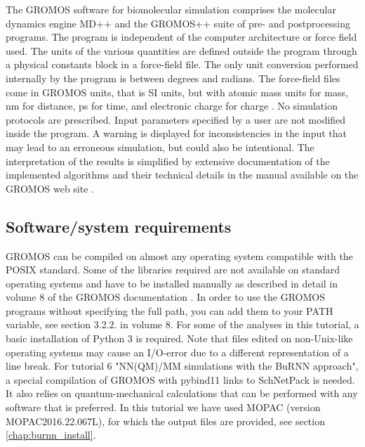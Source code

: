 The GROMOS software for biomolecular simulation comprises the molecular dynamics engine MD++ and the \linebreak GROMOS++ suite of pre- and postprocessing programs. The program is independent of the computer architecture or force field used. 
The units of the various quantities are defined outside the program through a physical constants block in a force-field file. The only unit conversion performed internally by the program is between degrees and radians. The force-field files come 
in GROMOS units, that is SI units, but with atomic mass units for mass, nm for distance, ps for time, and electronic charge for charge \cite{volume_6}. No simulation protocols are prescribed. 
Input parameters specified by a user are not modified inside 
the program. %
A warning is displayed for inconsistencies in the input that may lead to an erroneous simulation, but could also be intentional.
The interpretation of the results is simplified by extensive 
documentation of the implemented algorithms and their technical details 
in the manual available on the GROMOS web site \cite{volume_6,volume_2}.

\subsection{Software/system requirements}
%
GROMOS can be compiled on almost any operating system compatible with the POSIX standard.
 Some of the libraries required are not available on standard operating systems and have to be installed 
manually as described in detail in volume 8 of the GROMOS documentation \cite{volume_8}. 
In order to use the GROMOS programs without specifying the full path, you can add them to your PATH variable, see section 3.2.2. in volume 8.
For some of the analyses in this tutorial, a basic installation of Python 3 is required. 
Note that files edited on non-Unix-like operating systems may cause an I/O-error due to a different representation of a line break. For tutorial 6 "NN(QM)/MM simulations with the BuRNN approach", a special compilation of GROMOS with pybind11 links to SchNetPack is needed. It also relies on quantum-mechanical calculations that can be performed with any software that is preferred. In this tutorial we have used MOPAC (version MOPAC2016.22.067L), for which the output files are provided, see section \ref{chap:burnn_install}. 

